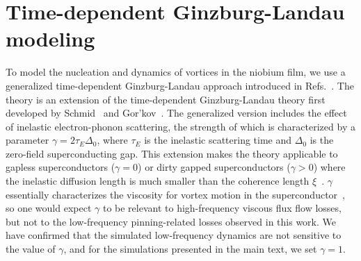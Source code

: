 \documentclass[%
 reprint,
 superscriptaddress,
 amsmath,
 amssymb,
 amsfonts,
 aps,
 prb,
]{revtex4-2}
\begin{document}
\section{Time-dependent Ginzburg-Landau modeling}
\label{sec:tdgl}

To model the nucleation and dynamics of vortices in the niobium film, we use a generalized time-dependent Ginzburg-Landau approach introduced in Refs.~\cite{Kramer1978-kb, Watts-Tobin1981-mn}. The theory is an extension of the time-dependent Ginzburg-Landau theory first developed by Schmid~\cite{Schmid1966-bh} and Gor'kov~\cite{Gorkov1996-do}. The generalized version includes the effect of inelastic electron-phonon scattering, the strength of which is characterized by a parameter $\gamma=2\tau_E\Delta_0$, where $\tau_E$ is the inelastic scattering time and $\Delta_0$ is the zero-field
superconducting gap. This extension makes the theory applicable to gapless superconductors ($\gamma=0$) or dirty gapped superconductors ($\gamma > 0$) where the inelastic diffusion length is much smaller than the coherence length $\xi$~\cite{Kopnin2001-ip}. $\gamma$ essentially characterizes the viscosity for vortex motion in the superconductor~\cite{Jelic2016-ww}, so one would expect $\gamma$ to be relevant to high-frequency viscous flux flow losses, but not to the low-frequency pinning-related losses observed in this work. We have confirmed that the simulated low-frequency dynamics are not sensitive to the value of $\gamma$, and for the simulations presented in the main text, we set $\gamma=1$.
\end{document}
